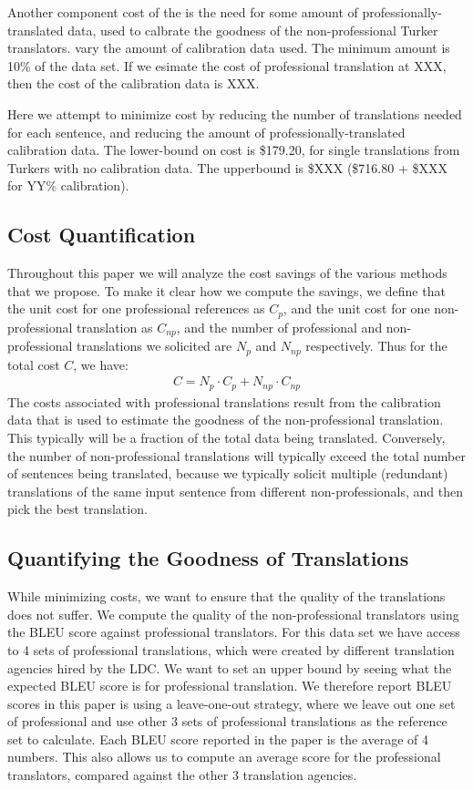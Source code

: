 \documentclass[11pt]{article}
\begin{document}
Another component cost of the   is the need for some amount of professionally-translated data, used to calbrate the goodness of the non-professional Turker translators.   vary the amount of calibration data used.  The minimum amount is 10\% of the data set.  If we esimate the cost of professional translation at XXX, then the cost of the calibration data is XXX.


Here we attempt to minimize cost by reducing the number of translations needed for each sentence, and reducing the amount of professionally-translated calibration data.  The lower-bound on cost is \$179.20, for single translations from Turkers with no calibration data.  The upperbound is \$XXX (\$716.80 + \$XXX for YY\% calibration).

\subsection{Cost Quantification}
Throughout this paper we will analyze the cost savings of the various methods that we propose.
To make it clear how we compute the savings, we define that the unit cost for one professional references as $C_{p}$, and the unit cost for one non-professional translation as $C_{np}$, and the number of professional and non-professional translations  we solicited are $N_{p}$ and $N_{np}$ respectively. Thus for the total cost $C$, we have:\\
  \begin{align*}
  C = N_{p} \cdot C_{p}  + N_{np} \cdot C_{np} 
  \end{align*}
The costs associated with professional translations result from the calibration data  that is used to estimate the goodness of the non-professional translation.  This typically will be a fraction of the total data being translated.  Conversely, the number of non-professional translations will typically exceed the total number of sentences being translated, because we typically solicit multiple (redundant) translations of the same input sentence from different non-professionals, and then pick the best translation. 
  
 \subsection{Quantifying the Goodness of Translations}
While minimizing costs, we want to ensure that the quality of the translations does not suffer.  We compute the quality of the non-professional translators using the BLEU score against professional translators.  For this data set we have access to 4 sets of professional translations, which were created by different translation agencies hired by the LDC.  We want to set an upper bound by seeing what the expected BLEU score is for professional translation.  We therefore report BLEU scores in this paper is using a leave-one-out strategy,  where we leave out one set  of professional and use other 3 sets of professional translations as the reference set to calculate.  Each BLEU score reported in the paper is the average of 4 numbers.  This also allows us to compute an average score for the professional translators, compared against the other 3 translation agencies.  
\end{document}
